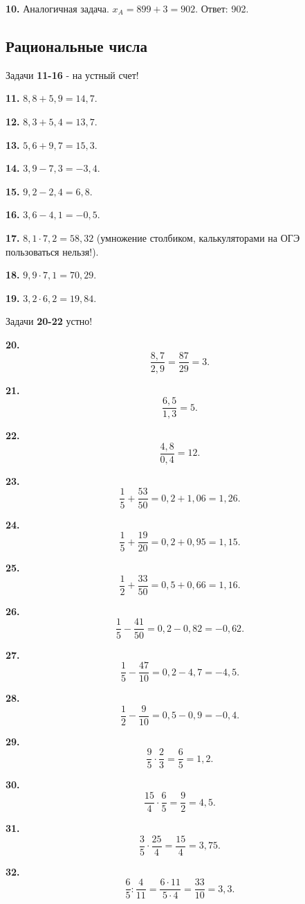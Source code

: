 \textbf{10.} Аналогичная задача. $x_A=899+3=902$. \newline \null \hspace*{\fill} Ответ: 902. 

\subsection{Рациональные числа}


Задачи \textbf{11-16} - на устный счет!

\textbf{11.} $8,8+5,9=14,7.$

\textbf{12.} $8,3+5,4=13,7.$

\textbf{13.} $5,6+9,7=15,3.$

\textbf{14.} $3,9-7,3=-3,4.$

\textbf{15.} $9,2-2,4=6,8.$

\textbf{16.} $3,6-4,1= -0,5.$

\textbf{17.} $8,1\cdot7,2=58,32$ (умножение столбиком, калькуляторами на ОГЭ пользоваться нельзя!).

\textbf{18.} $9,9\cdot7,1=70,29.$

\textbf{19.} $3,2\cdot6,2=19,84.$

Задачи \textbf{20-22} устно!

\textbf{20.} $$\frac{8,7}{2,9}=\frac{87}{29}=3.$$

\null \textbf{21.} $$\frac{6,5}{1,3}=5.$$

\textbf{22.} $$\frac{4,8}{0,4}=12.$$

\textbf{23.} $$\frac{1}{5}+\frac{53}{50}=0,2+1,06=1,26.$$

\textbf{24.} $$\frac{1}{5}+\frac{19}{20}=0,2+0,95=1,15.$$

\newpage \textbf{25.} $$\frac{1}{2}+\frac{33}{50}=0,5+0,66=1,16.$$

\textbf{26.} $$\frac{1}{5}-\frac{41}{50}=0,2-0,82=-0,62.$$

\textbf{27.} $$\frac{1}{5}-\frac{47}{10}=0,2-4,7=-4,5.$$

\textbf{28.} $$\frac{1}{2}-\frac{9}{10}=0,5-0,9=-0,4.$$

\textbf{29.} $$\frac{9}{5}\cdot\frac{2}{3}=\frac{6}{5}=1,2.$$
 
\textbf{30.} $$\frac{15}{4}\cdot\frac{6}{5}=\frac{9}{2}=4,5.$$

\textbf{31.} $$\frac{3}{5}\cdot\frac{25}{4}=\frac{15}{4}=3,75.$$

\textbf{32.} $$\frac{6}{5}:\frac{4}{11}=\frac{6\cdot11}{5\cdot4}=\frac{33}{10}=3,3.$$

